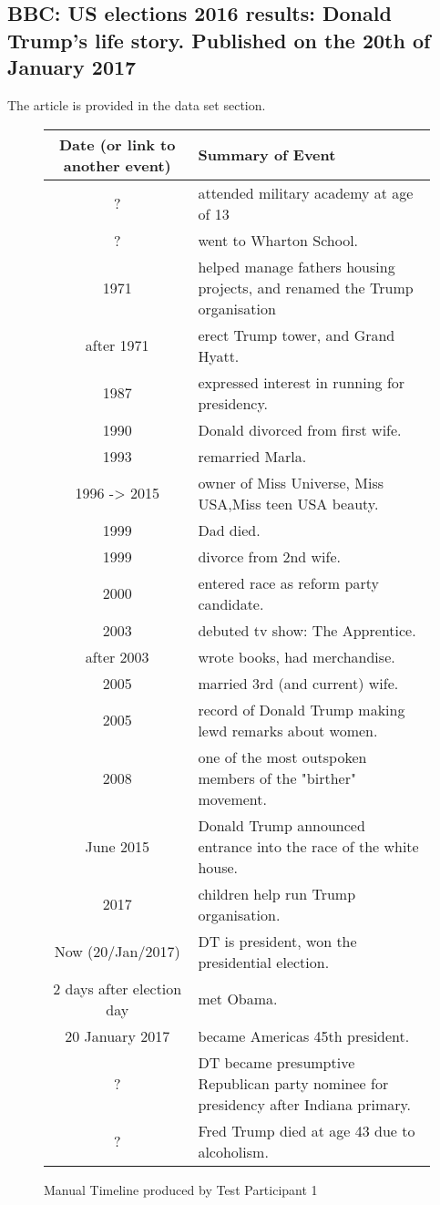 \subsection{BBC: US elections 2016 results: Donald Trump's life story. Published on the 20th of January 2017}
\par The article is provided in the data set section.
\begin{figure}[H]
\begin{tabular}{|c|p{8.5cm}|}
\hline
Date (or link to another event) & Summary of Event\\
\hline
\hline
? & attended military academy at age of 13\\
\hline
? & went to Wharton School.\\
\hline
1971 & helped manage fathers housing projects, and renamed the Trump organisation\\
\hline
after 1971 & erect Trump tower, and Grand Hyatt.\\
\hline
1987 & expressed interest in running for presidency.\\
\hline
1990 & Donald divorced from first wife.\\
\hline
1993 & remarried Marla.\\
\hline
1996 -> 2015 &  owner of Miss Universe, Miss USA,Miss teen USA beauty.\\
\hline
1999 & Dad died.\\
\hline
1999 & divorce from 2nd wife.\\
\hline
2000 & entered race as reform party candidate.\\
\hline
2003 & debuted tv show: The Apprentice.\\
\hline
after 2003 & wrote books, had merchandise.\\
\hline
2005 & married 3rd (and current) wife.\\
\hline
2005 & record of Donald Trump making lewd remarks about women.\\
\hline
2008 & one of the most outspoken members of the "birther" movement.\\
\hline
June 2015 & Donald Trump announced entrance into the race of the white house.\\
\hline
2017 & children help run Trump organisation.\\
\hline
Now (20/Jan/2017) & DT is president, won the presidential election.\\
\hline
2 days after election day & met Obama.\\
\hline
20 January 2017 & became Americas 45th president.\\
\hline
? &DT became presumptive Republican party nominee for presidency after Indiana primary.\\
\hline
? & Fred Trump died at age 43 due to alcoholism.\\
\hline
\end{tabular}
\caption{Manual Timeline produced by Test Participant 1}
\end{figure}

